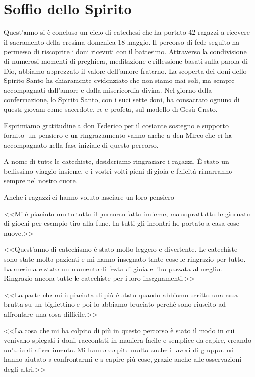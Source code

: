\section{Soffio dello Spirito}

Quest'anno si è concluso un ciclo di catechesi che ha portato 42 ragazzi a ricevere il sacramento della cresima domenica 18 maggio. Il percorso di fede seguito ha permesso di riscoprire i doni ricevuti con il battesimo. Attraverso la condivisione di numerosi momenti di preghiera, meditazione e riflessione basati sulla parola di Dio, abbiamo apprezzato il valore dell'amore fraterno. La scoperta dei doni dello Spirito Santo ha chiaramente evidenziato che non siamo mai soli, ma sempre accompagnati dall'amore e dalla misericordia divina. Nel giorno della confermazione, lo Spirito Santo, con i suoi sette doni, ha consacrato ognuno di questi giovani come sacerdote, re e profeta, sul modello di Gesù Cristo.

Esprimiamo gratitudine a don Federico per il costante sostegno e supporto fornito; un pensiero e un ringraziamento vanno anche a don Mirco che ci ha accompagnato nella fase iniziale di questo percorso.

A nome di tutte le catechiste, desideriamo ringraziare i ragazzi. È stato un bellissimo viaggio insieme, e i vostri volti pieni di gioia e felicità rimarranno sempre nel nostro cuore.



\clearpage

Anche i ragazzi ci hanno voluto lasciare un loro pensiero

<<Mi è piaciuto molto tutto il percorso fatto insieme, ma soprattutto le giornate di giochi per esempio tiro alla fune. In tutti gli incontri ho portato a casa cose nuove.>>

<<Quest'anno di catechismo è stato molto leggero e divertente. Le catechiste sono state molto pazienti e mi hanno insegnato tante cose le ringrazio per tutto. La cresima e stato un momento di festa di gioia e l'ho passata al meglio. Ringrazio ancora tutte le catechiste per i loro insegnamenti.>>

<<La parte che mi è piaciuta di più è stato quando abbiamo scritto una cosa brutta su un bigliettino e poi lo abbiamo bruciato perché sono riuscito ad affrontare una cosa difficile.>>

<<La cosa che mi ha colpito di più in questo percorso è stato il modo in cui venivano spiegati i doni, raccontati in maniera facile e semplice da capire, creando un'aria di divertimento. Mi hanno colpito molto anche i lavori di gruppo: mi hanno aiutato a confrontarmi e a capire più cose, grazie anche alle osservazioni degli altri.>>

